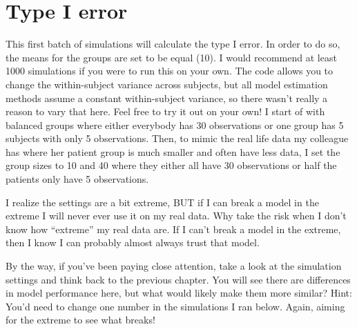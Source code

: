 \documentclass[
]{book}
\begin{document}
\hypertarget{type-i-error}{%
\section{Type I error}\label{type-i-error}}

This first batch of simulations will calculate the type I error. In order to do so, the means for the groups are set to be equal (10). I would recommend at least 1000 simulations if you were to run this on your own. The code allows you to change the within-subject variance across subjects, but all model estimation methods assume a constant within-subject variance, so there wasn't really a reason to vary that here. Feel free to try it out on your own! I start of with balanced groups where either everybody has 30 observations or one group has 5 subjects with only 5 observations. Then, to mimic the real life data my colleague has where her patient group is much smaller and often have less data, I set the group sizes to 10 and 40 where they either all have 30 observations or half the patients only have 5 observations.

I realize the settings are a bit extreme, BUT if I can break a model in the extreme I will never ever use it on my real data. Why take the risk when I don't know how ``extreme'' my real data are. If I can't break a model in the extreme, then I know I can probably almost always trust that model.

By the way, if you've been paying close attention, take a look at the simulation settings and think back to the previous chapter. You will see there are differences in model performance here, but what would likely make them more similar? Hint: You'd need to change one number in the simulations I ran below. Again, aiming for the extreme to see what breaks!
\end{document}
